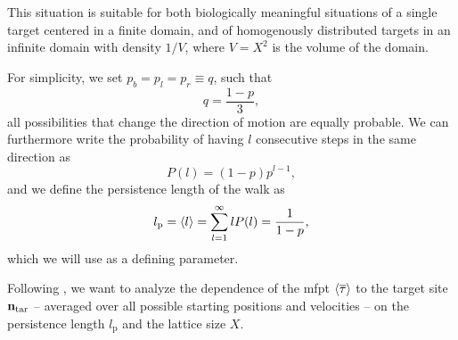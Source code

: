 This situation is suitable for both biologically meaningful situations of a single target centered in a finite domain, and of homogenously distributed targets in an infinite domain with density $1/V$, where \mbox{$V = X^2$} is the volume of the domain.

For simplicity, we set $p_b = p_l = p_r \equiv q$, such that
\begin{equation*}
 q = \frac{1-p}{3},
\end{equation*}
\ie all possibilities that change the direction of motion are equally probable. We can furthermore write the probability of having $l$ consecutive steps in the same direction as
\begin{equation*}
 P(l) = (1-p) p^{l-1},
\end{equation*}
and we define the persistence length of the walk as
\begin{equation*}
 l_\textrm{p} = \avg{l} = \sum\limits_{l=1}^\infty l P(l) = \frac{1}{1-p},
\end{equation*}
which we will use as a defining parameter.

Following \cite{tejedor:2012}, we want to analyze the dependence of the \ac{mfpt} $\mfpt[\mean{\tau}]$ to the target site $\bv{n}_\textrm{tar}$ -- averaged over all possible starting positions and velocities -- on the persistence length $l_\textrm{p}$ and the lattice size $X$.

